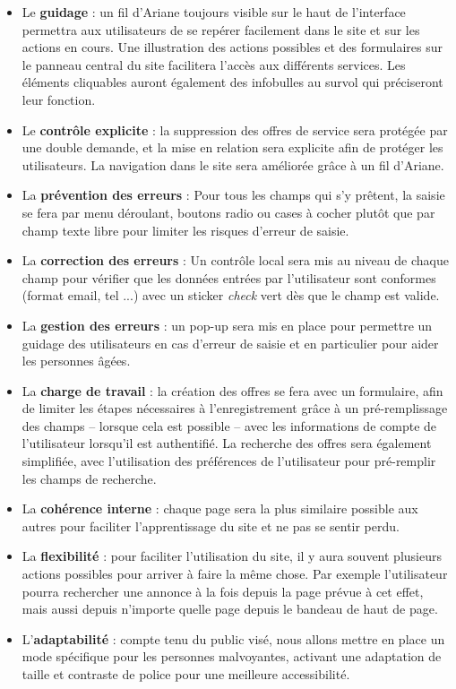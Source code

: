 \documentclass[a4paper,11pt]{article}
\begin{document}
\begin{itemize}
  \item Le \textbf{guidage} : un fil d’Ariane toujours visible sur le haut de l’interface permettra aux utilisateurs de
  se repérer facilement dans le site et sur les actions en cours. Une illustration des actions
  possibles et des formulaires sur le panneau central du site facilitera l’accès aux différents
  services. Les éléments cliquables auront également des infobulles au survol qui préciseront leur fonction.
  \item Le \textbf{contrôle explicite} : la suppression des offres de service sera protégée par une double
  demande, et la mise en relation sera explicite afin de protéger les utilisateurs.
  La navigation dans le site sera améliorée grâce à un fil d'Ariane.
  \item La \textbf{prévention des erreurs} : Pour tous les champs qui s'y prêtent, la saisie se fera par menu déroulant, boutons radio ou cases à cocher plutôt que par champ texte libre pour limiter les risques d'erreur de saisie.
  \item La \textbf{correction des erreurs} : Un contrôle local sera mis au niveau de chaque champ pour vérifier que
  les données entrées par l'utilisateur sont conformes (format email, tel ...) avec un sticker \textit{check} vert
  dès que le champ est valide.
  \item La \textbf{gestion des erreurs} : un pop-up sera mis en place pour permettre un guidage des
  utilisateurs en cas d’erreur de saisie et en particulier pour aider les personnes âgées.
  \item La \textbf{charge de travail} : la création des offres se fera avec un formulaire, afin de limiter les étapes
  nécessaires à l’enregistrement grâce à un pré-remplissage des champs -- lorsque cela est possible --
  avec les informations de compte de l’utilisateur lorsqu’il est authentifié. La recherche des
  offres sera également simplifiée, avec l’utilisation des préférences de l’utilisateur pour
  pré-remplir les champs de recherche.
  \item La \textbf{cohérence interne} : chaque page sera la plus similaire possible aux autres pour faciliter
  l'apprentissage du site et ne pas se sentir perdu.
  \item La \textbf{flexibilité} : pour faciliter l'utilisation du site, il y aura souvent plusieurs actions possibles
  pour arriver à faire la même chose. Par exemple l'utilisateur pourra rechercher une annonce à la fois depuis
  la page prévue à cet effet, mais aussi depuis n'importe quelle page depuis le bandeau de haut de page.
  \item L'\textbf{adaptabilité} : compte tenu du public visé, nous allons mettre en place un mode spécifique
  pour les personnes malvoyantes, activant une adaptation de taille et contraste de police pour
  une meilleure accessibilité.
\end{itemize}
\end{document}

